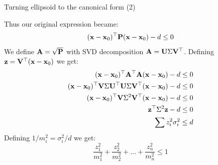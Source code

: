 \documentclass{beamer}
\begin{document}
\begin{frame}{Turning ellipsoid to the canonical form (2)}
	\begin{flushleft}
		
		Thus our original expression became:
		\begin{align}
			(\mathbf{x} - \mathbf{x}_0)^\top \mathbf{P}(\mathbf{x} - \mathbf{x}_0) - d \leq 0
		\end{align}
		We define $\mathbf{A} = \sqrt{\mathbf{P}}$ with SVD decomposition $\mathbf{A} = \mathbf{U} \Sigma \mathbf{V}^\top$. Defining $\mathbf{z} = \mathbf{V}^\top (\mathbf{x} - \mathbf{x}_0)$ we get:
	\begin{align}
		(\mathbf{x} - \mathbf{x}_0)^\top \mathbf{A}^\top\mathbf{A}(\mathbf{x} - \mathbf{x}_0) - d \leq 0 
		\\
		(\mathbf{x} - \mathbf{x}_0)^\top  \mathbf{V} \Sigma \mathbf{U}^\top  \mathbf{U} \Sigma \mathbf{V}^\top(\mathbf{x} - \mathbf{x}_0) - d \leq 0 
		\\
		(\mathbf{x} - \mathbf{x}_0)^\top  \mathbf{V} \Sigma^2 \mathbf{V}^\top(\mathbf{x} - \mathbf{x}_0) - d \leq 0
		\\
		\mathbf{z}^\top   \Sigma^2 \mathbf{z} - d \leq 0
		\\
		\sum z_i^2 \sigma_i^2  \leq d
	\end{align}
%
Defining $1/m_i^2 = \sigma_i^2 / d$ we get:
%
\begin{equation}
	\frac{z_1^2}{m_1^2} + \frac{z_2^2}{m_2^2} + ... + 
	\frac{z_n^2}{m_n^2} \leq 1
\end{equation}
		
		
	\end{flushleft}
\end{frame}
\end{document}
